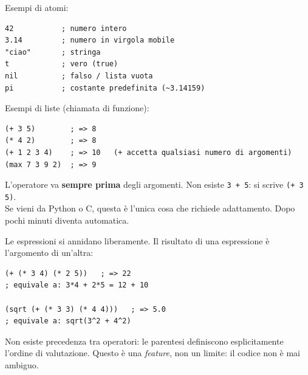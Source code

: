 
Esempi di atomi:

\begin{esempio}[Atomi]
\begin{lstlisting}
42           ; numero intero
3.14         ; numero in virgola mobile
"ciao"       ; stringa
t            ; vero (true)
nil          ; falso / lista vuota
pi           ; costante predefinita (~3.14159)
\end{lstlisting}
\end{esempio}

Esempi di liste (chiamata di funzione):

\begin{esempio}
\begin{lstlisting}
(+ 3 5)        ; => 8
(* 4 2)        ; => 8
(+ 1 2 3 4)    ; => 10   (+ accetta qualsiasi numero di argomenti)
(max 7 3 9 2)  ; => 9
\end{lstlisting}
\end{esempio}

\begin{attenzione}
L'operatore va \textbf{sempre prima} degli argomenti. Non esiste
\texttt{3 + 5}: si scrive \texttt{(+ 3 5)}.\\[4pt]
Se vieni da Python o C, questa è l'unica cosa che richiede
adattamento. Dopo pochi minuti diventa automatica.
\end{attenzione}

\seprule


Le espressioni si annidano liberamente. Il risultato di una
espressione è l'argomento di un'altra:

\begin{esempio}
\begin{lstlisting}
(+ (* 3 4) (* 2 5))   ; => 22
; equivale a: 3*4 + 2*5 = 12 + 10

(sqrt (+ (* 3 3) (* 4 4)))   ; => 5.0
; equivale a: sqrt(3^2 + 4^2)
\end{lstlisting}
\end{esempio}


\begin{nota}
Non esiste precedenza tra operatori: le parentesi definiscono esplicitamente
l'ordine di valutazione. Questo è una \emph{feature}, non un limite:
il codice non è mai ambiguo.
\end{nota}

